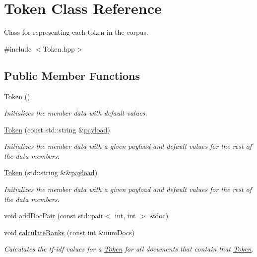 \hypertarget{class_token}{}\section{Token Class Reference}
\label{class_token}


Class for representing each token in the corpus.  




{\ttfamily \#include $<$Token.\+hpp$>$}

\subsection*{Public Member Functions}
\begin{DoxyCompactItemize}
\item 
\hyperlink{class_token_aa3c5868ba4115f3189df6b2ac5b36f39}{Token} ()
\begin{DoxyCompactList}\small\item\em Initializes the member data with default values. \end{DoxyCompactList}\item 
\hyperlink{class_token_afbdab46261b6980bebf75e1c910d19ec}{Token} (const std\+::string \&\hyperlink{class_token_a518dac411db3279a9b2f4ce38e46d199}{payload})
\begin{DoxyCompactList}\small\item\em Initializes the member data with a given payload and default values for the rest of the data members. \end{DoxyCompactList}\item 
\hyperlink{class_token_a1385cdd373c4f869067bcf4e4549b35e}{Token} (std\+::string \&\&\hyperlink{class_token_a518dac411db3279a9b2f4ce38e46d199}{payload})
\begin{DoxyCompactList}\small\item\em Initializes the member data with a given payload and default values for the rest of the data members. \end{DoxyCompactList}\item 
void \hyperlink{class_token_a3c9d92534dea1cf1664b049bbc497631}{add\+Doc\+Pair} (const std\+::pair$<$ int, int $>$ \&doc)
\item 
void \hyperlink{class_token_a98fb92871af9b32ec5dc5b1b16a3b92d}{calculate\+Ranks} (const int \&num\+Docs)
\begin{DoxyCompactList}\small\item\em Calculates the tf-\/idf values for a \hyperlink{class_token}{Token} for all documents that contain that \hyperlink{class_token}{Token}. \end{DoxyCompactList}\item 

\end{DoxyCompactItemize}
